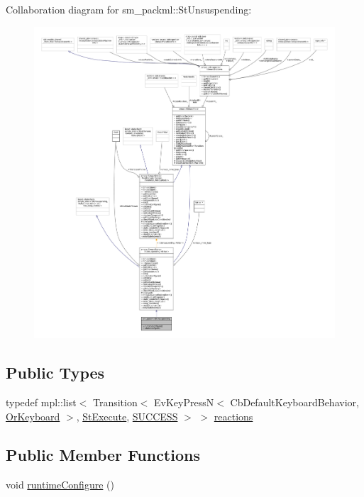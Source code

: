 Collaboration diagram for sm\+\_\+packml\+:\+:St\+Unsuspending\+:
\nopagebreak
\begin{figure}[H]
\begin{center}
\leavevmode
\includegraphics[width=350pt]{structsm__packml_1_1StUnsuspending__coll__graph}
\end{center}
\end{figure}
\subsection*{Public Types}
\begin{DoxyCompactItemize}
\item 
typedef mpl\+::list$<$ Transition$<$ Ev\+Key\+PressN$<$ Cb\+Default\+Keyboard\+Behavior, \hyperlink{classsm__packml_1_1OrKeyboard}{Or\+Keyboard} $>$, \hyperlink{structsm__packml_1_1StExecute}{St\+Execute}, \hyperlink{classSUCCESS}{S\+U\+C\+C\+E\+SS} $>$ $>$ \hyperlink{structsm__packml_1_1StUnsuspending_a3b12f7aa7f6d40e697bbc5b90e0f6f67}{reactions}
\end{DoxyCompactItemize}
\subsection*{Public Member Functions}
\begin{DoxyCompactItemize}
\item 
void \hyperlink{structsm__packml_1_1StUnsuspending_a53d33e8289d08f4f279fb68141bb1cdb}{runtime\+Configure} ()
\end{DoxyCompactItemize}
